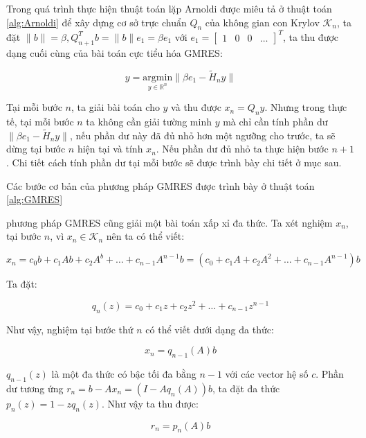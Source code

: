 \documentclass[14pt, a4paper]{article}
\numberwithin{equation}{section}
\numberwithin{algorithm}{section}
\numberwithin{figure}{section}
\numberwithin{dl}{section}
\numberwithin{md}{section}
\numberwithin{bd}{section}
\numberwithin{dn}{section}
\numberwithin{hq}{section}
\begin{document}
Trong quá trình thực hiện thuật toán lặp Arnoldi được miêu tả ở thuật toán \ref{alg:Arnoldi} để xây dựng cơ sở trực chuẩn $Q_n$ của không gian con Krylov $\mathcal{K}_n$, ta đặt $\lVert b \rVert = \beta, Q_{n+1}^T b=\lVert b \rVert e_1=\beta e_1$ với $e_1 = \begin{bmatrix}
    1 & 0 & 0 & \dots
\end{bmatrix}^T$, ta thu được dạng cuối cùng của bài toán cực tiểu hóa GMRES:

\begin{equation}
    y = \underset{y \in \mathbb{R}^{n}}{\mathrm{argmin}} \lVert \beta e_1 - \widetilde{H}_n y \rVert
\end{equation}

Tại mỗi bước $n$, ta giải bài toán cho $y$ và thu được $x_n = Q_n y$. Nhưng trong thực tế, tại mỗi bước $n$ ta không cần giải tường minh $y$ mà chỉ cần tính phần dư $\lVert \beta e_1 - \widetilde{H}_n y \rVert$, nếu phần dư này đã đủ nhỏ hơn một ngưỡng cho trước, ta sẽ dừng tại bước $n$ hiện tại và tính $x_n$. Nếu phần dư đủ nhỏ ta thực hiện bước $n+1$. Chi tiết cách tính phần dư tại mỗi bước sẽ được trình bày chi tiết ở mục sau.

Các bước cơ bản của phương pháp GMRES được trình bày ở thuật toán \ref{alg:GMRES}

phương pháp GMRES cũng giải một bài toán xấp xỉ đa thức. Ta xét nghiệm $x_n$, tại bước $n$, vì $x_n \in \mathcal{K}_n$ nên ta có thể viết:

\begin{equation}
    x_n = c_0 b + c_1 A b + c_2 A^b + \dots + c_{n-1}A^{n-1}b=(c_0 + c_1 A + c_2 A^2 + \dots + c_{n-1} A^{n-1})b
\end{equation}

Ta đặt:

\begin{equation}
    q_n(z) = c_0 + c_1 z + c_2 z^2 + \dots + c_{n-1}z^{n-1}
\end{equation}

Như vậy, nghiệm tại bước thứ $n$ có thể viết dưới dạng đa thức:

\begin{equation}
    x_n = q_{n-1}(A)b
\end{equation}

$q_{n-1}(z)$ là một đa thức có bậc tối đa bằng $n-1$ với các vector hệ số $c$. Phần dư tương ứng $r_n=b - Ax_n=(I - Aq_n(A))b$, ta đặt đa thức $p_n(z) = 1 - z q_n(z)$. Như vậy ta thu được:

\begin{equation} \label{eq:Polynomial-Approximation}
    r_n = p_n(A)b
\end{equation}
\end{document}
